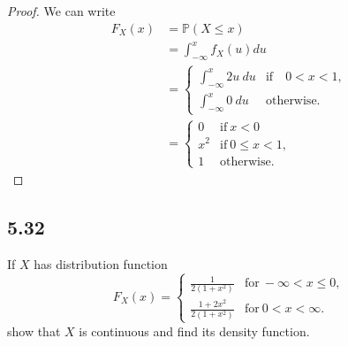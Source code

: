 \documentclass{article}
\renewcommand{\P}[1]{\mathbb{P}(#1)}
\begin{document}
\begin{proof}
    We can write
    \begin{align*}
        F_X(x) & = \P{X \leq x}                                          \\
               & = \int_{-\infty}^x f_X(u)du                             \\
               & = \begin{cases}
                       \int_{-\infty}^x 2u \ du & \text{if} \quad 0 < x < 1, \\
                       \int_{-\infty}^x 0 \ du  & \text{otherwise.}
                   \end{cases} \\
               & = \begin{cases}
                       0   & \text{if} \ x < 0         \\
                       x^2 & \text{if} \ 0 \leq x < 1, \\
                       1   & \text{otherwise}.
                   \end{cases}
    \end{align*}
\end{proof}

\subsection*{5.32}
If $X$ has distribution function
\begin{equation*}
    F_X(x) = \begin{cases}
        \frac{1}{2(1+x^2)}      & \text{for} \ -\infty < x \leq 0, \\
        \frac{1+2x^2}{2(1+x^2)} & \text{for} \ 0 < x < \infty.
    \end{cases}
\end{equation*}
show that $X$ is continuous and find its density function.
\end{document}
